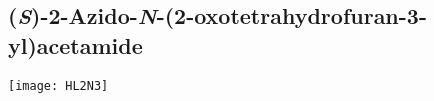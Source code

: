{{{{{{{{{{{{{{{{{{{%

\subsection{(\textit{S})-2-Azido-\textit{N}-(2-oxotetrahydrofuran-3-yl)acetamide }


\begin{scheme}[H]
	\begin{center}
		\texttt{[image: HL2N3]}
	\end{center}
\end{scheme}

}}}}}}}}}}}}}}}}}}}

